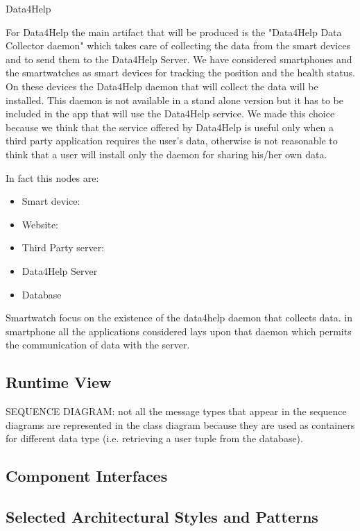 \documentclass[a4paper]{article}
\begin{document}
Data4Help \newline

For Data4Help the main artifact that will be produced is the "Data4Help Data Collector daemon" which takes care of collecting the data from the smart devices and to send them to the Data4Help Server. We have considered smartphones and the smartwatches as smart devices for tracking the position and the health status. On these devices the Data4Help daemon that will collect the data will be installed. This daemon is not available in a stand alone version but it has to be included in the app that will use the Data4Help service. We made this choice because we think that the service offered by Data4Help is useful only when a third party application requires the user's data, otherwise is not reasonable to think that a user will install only the daemon for sharing his/her own data.



In fact this nodes are:


\begin{itemize}
    \item Smart device: 
    \item Website:
    \item Third Party server:
    \item Data4Help Server
    \item Database
\end{itemize}


Smartwatch focus on the existence of the data4help daemon that collects data. 
in smartphone all the applications considered lays upon that daemon which permits the communication of data with the server.

\clearpage

\subsection{Runtime View}
SEQUENCE DIAGRAM: not all the message types that appear in the sequence diagrams are represented in the class diagram because they are used as containers for different data type (i.e. retrieving a user tuple from the database).

\subsection{Component Interfaces}

\subsection{Selected Architectural Styles and Patterns}
\end{document}
